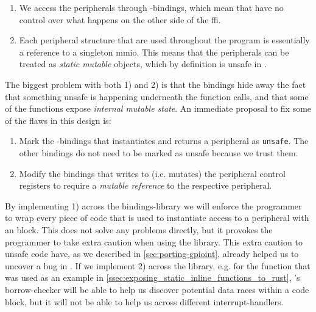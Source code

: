 \begin{enumerate}[\hspace{13}1)]
    \item We access the peripherals through {\C}-bindings, which mean that {\rust} have no control over what happens on the other side of the \gls{ffi}.

    \item Each peripheral structure that are used throughout the program is essentially a reference to a singleton \gls{mmio}.
    This means that the peripherals can be treated as \emph{static mutable} objects, which by definition is unsafe in {\rust}.

\end{enumerate}

The biggest problem with both 1) and 2) is that the bindings hide away the fact that something unsafe is happening underneath the function calls, and that some of the functions expose \emph{internal mutable state}.
An immediate proposal to fix some of the flaws in this design is:

\begin{enumerate}[\hspace{13}1)]
    \item Mark the {\rust}-bindings that instantiates and returns a peripheral as \texttt{unsafe}.
    The other bindings do not need to be marked as unsafe because we trust them.

    \item Modify the bindings that writes to (i.e. mutates) the peripheral control registers to require a \emph{mutable reference} to the respective peripheral.
\end{enumerate}

By implementing 1) across the bindings-library we will enforce the programmer to wrap every piece of code that is used to instantiate access to a peripheral with an  block.
This does not solve any problems directly, but it provokes the programmer to take extra caution when using the library.
This extra caution to unsafe code have, as we described in \autoref{sec:porting-gpioint}, already helped us to  uncover a bug in .
If we implement 2) across the library, e.g. for the function that was used as an example in \autoref{ssec:exposing_static_inline_functions_to_rust}, {\rust}'s borrow-checker will be able to help us discover potential data races within a code block, but it will not be able to help us across different interrupt-handlers.

